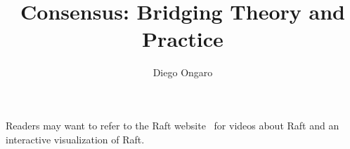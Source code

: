 \documentclass[11pt]{report}
\title{Consensus: Bridging Theory and Practice}
\author{Diego Ongaro}
\theoremstyle{definition}
\begin{document}
\beforepreface




Readers may want to refer to the Raft website~\cite{implementations} for
videos about Raft and an interactive visualization of Raft.


\afterpreface

\let\Chaptermark\chaptermark
\renewcommand\chaptermark[1]{
\def\Chaptername{#1}\Chaptermark{#1}
}

\newcommand{\vcaption}[2][Figure]{
  \caption[\Chaptername: #1]{#2}
}


\newcommand\cold{$C_\text{old}$}
\newcommand\cnew{$C_\text{new}$}
\newcommand\cboth{$C_\text{old,new}$}















\appendix




\label{end}



\end{document}
